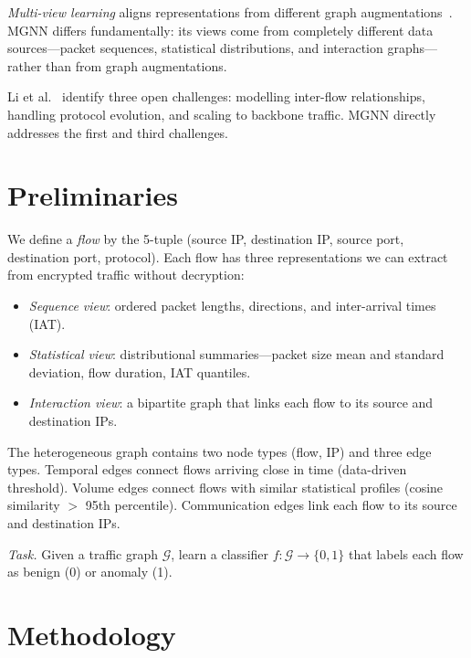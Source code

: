 \documentclass[conference]{IEEEtran}
\begin{document}
\textit{Multi-view learning} aligns representations from different graph augmentations~\cite{hotelling1936relations}. MGNN differs fundamentally: its views come from completely different data sources---packet sequences, statistical distributions, and interaction graphs---rather than from graph augmentations.

Li et al.~\cite{li2024survey} identify three open challenges: modelling inter-flow relationships, handling protocol evolution, and scaling to backbone traffic. MGNN directly addresses the first and third challenges.


\section{Preliminaries}
\label{sec:prelude}

We define a \textit{flow} by the 5-tuple (source IP, destination IP, source port, destination port, protocol). Each flow has three representations we can extract from encrypted traffic without decryption:

\begin{itemize}[nosep]
    \item \textit{Sequence view}: ordered packet lengths, directions, and inter-arrival times (IAT).
    \item \textit{Statistical view}: distributional summaries---packet size mean and standard deviation, flow duration, IAT quantiles.
    \item \textit{Interaction view}: a bipartite graph that links each flow to its source and destination IPs.
\end{itemize}

The heterogeneous graph contains two node types (flow, IP) and three edge types. Temporal edges connect flows arriving close in time (data-driven threshold). Volume edges connect flows with similar statistical profiles (cosine similarity $>$ 95th percentile). Communication edges link each flow to its source and destination IPs.

\textit{Task.} Given a traffic graph $\mathcal{G}$, learn a classifier $f: \mathcal{G} \to \{0,1\}$ that labels each flow as benign (0) or anomaly (1).

\section{Methodology}
\label{sec:method}
\end{document}
